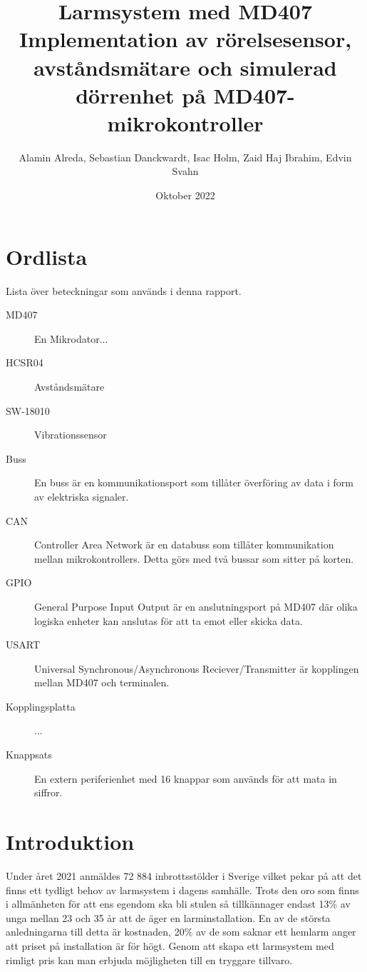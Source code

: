 \documentclass{article}
\title{\textbf{Larmsystem med MD407}\\ 
    \hspace{10cm}
    \small Implementation av rörelsesensor, avståndsmätare och simulerad dörrenhet på MD407-mikrokontroller}
\author{Alamin Alreda, Sebastian Danckwardt, Isac Holm, Zaid Haj Ibrahim, Edvin Svahn}
\date{Oktober 2022}
\begin{document}
\maketitle
\newpage
\tableofcontents
\newpage
\section*{Ordlista}
Lista över beteckningar som används i denna rapport.
\begin{description}

\item[MD407] En Mikrodator...

\item[HCSR04] Avståndsmätare

\item[SW-18010] Vibrationssensor

\item[Buss] En buss är en kommunikationsport som tillåter överföring av data i form av elektriska signaler.

\item[CAN] Controller Area Network är en databuss som tillåter kommunikation mellan mikrokontrollers. Detta görs med två bussar som sitter på korten.

\item[GPIO] General Purpose Input Output är en anslutningsport på MD407 där olika logiska enheter kan anslutas för att ta emot eller skicka data.

\item[USART] Universal Synchronous/Asynchronous Reciever/Transmitter är kopplingen mellan MD407 och terminalen.

\item[Kopplingsplatta] ...

\item[Knappsats] En extern periferienhet med 16 knappar som används för att mata in siffror.

\item[]


\end{description}
 \newpage

\setcounter{page}{1}
\section{Introduktion}
Under året 2021 anmäldes 72 884 inbrottsstölder i Sverige vilket pekar på att det finns ett tydligt behov av larmsystem i dagens samhälle.\cite{BRa} Trots den oro som finns i allmänheten för att ens egendom ska bli stulen så tillkännager endast 13\% av unga mellan 23 och 35 år att de äger en larminstallation.\cite{MoFor} En av de största anledningarna till detta är kostnaden, 20\% av de som saknar ett hemlarm anger att priset på installation är för högt.\cite{MoFor} Genom att skapa ett larmsystem med rimligt pris kan man erbjuda möjligheten till en tryggare tillvaro.
\end{document}
